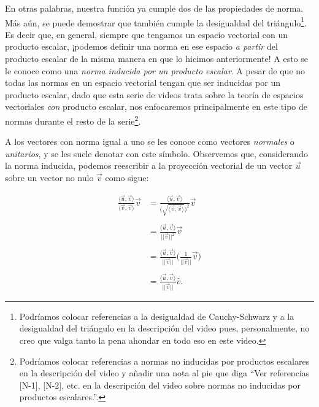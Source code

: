 \documentclass[12pt,dvipsnames]{article}
\numberwithin{equation}{section}
\begin{document}
\noindent En otras palabras, nuestra función ya cumple dos de las propiedades de norma. Más aún, se puede demostrar que también cumple la desigualdad del triángulo\footnote{Podríamos colocar referencias a la desigualdad de Cauchy-Schwarz y a la desigualdad del triángulo en la descripción del video pues, personalmente, no creo que valga tanto la pena ahondar en todo eso en este video.}. Es decir que, en general, siempre que tengamos un espacio vectorial con un producto escalar, ¡podemos definir una norma en ese espacio \emph{a partir} del producto escalar de la misma manera en que lo hicimos anteriormente! A esto se le conoce como una \emph{norma inducida por un producto escalar}. A pesar de que no todas las normas en un espacio vectorial tengan que ser inducidas por un producto escalar, dado que esta serie de videos trata sobre la teoría de espacios vectoriales \emph{con} producto escalar, nos enfocaremos principalmente en este tipo de normas durante el resto de la serie\footnote{Podríamos colocar referencias a normas no inducidas por productos escalares en la descripción del video y añadir una nota al pie que diga ``Ver referencias [N-1], [N-2], etc. en la descripción del video sobre normas no inducidas por productos escalares.''.}.

A los vectores con norma igual a uno se les conoce como vectores \emph{normales} o \emph{unitarios}, y se les suele denotar con este símbolo. Observemos que, considerando la norma inducida, podemos reescribir a la proyección vectorial de un vector $\vec{u}$ sobre un vector no nulo $\vec{v}$ como sigue:

\begin{align*}
    \frac{\langle \vec{u} , \vec{v} \rangle}{\langle \vec{v} , \vec{v} \rangle} \vec{v} &= \frac{\langle \vec{u} , \vec{v} \rangle}{\big(\sqrt{\langle \vec{v} , \vec{v} \rangle}\big)^2} \vec{v} \\ \\
                                                                                        &= \frac{\langle \vec{u} , \vec{v} \rangle}{||\vec{v}||^2} \vec{v} \\ \\
                                                                                        &= \frac{\langle \vec{u} , \vec{v} \rangle}{||\vec{v}||} \bigg( \frac{1}{||\vec{v}||} \vec{v} \bigg) \\ \\
                                                                                        &= \frac{\langle \vec{u} , \vec{v} \rangle}{||\vec{v}||} \hat{v}.
\end{align*}
\end{document}
